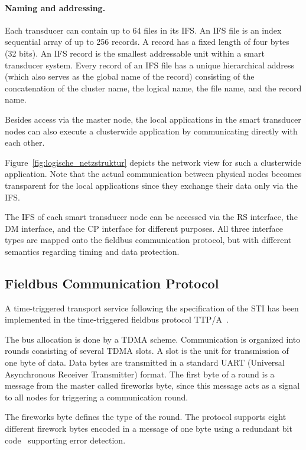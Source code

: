 \documentclass[11pt,a4paper,]{article}
\begin{document}
\paragraph{Naming and addressing.}

Each transducer can contain up to 64 files in its \ac{IFS}. An
\ac{IFS} file is an index sequential array of up to 256 records. A
record has a fixed length of four bytes (32 bits). An \ac{IFS}
record is the smallest addressable unit within a smart transducer
system. Every record of an \ac{IFS} file has a unique hierarchical
address (which also serves as the global name of the record)
consisting of the concatenation of the cluster name, the logical
name, the file name, and the record name.

Besides access via the master node, the local applications in the
smart transducer nodes can also execute a clusterwide application
by communicating directly with each other.

Figure~\ref{fig:logische_netzstruktur} depicts the network view for
such a clusterwide application. Note that the actual communication
between physical nodes becomes transparent for the local
applications since they exchange their data only via the \ac{IFS}.

The \ac{IFS} of each smart transducer node can be accessed via the
RS interface, the DM interface, and the CP interface for different
purposes. All three interface types are mapped onto the fieldbus
communication protocol, but with different semantics regarding
timing and data protection.

\subsection{Fieldbus Communication Protocol} \label{sec:fieldbus}

A time-triggered transport service following the specification of
the STI has been implemented in the time-triggered fieldbus
protocol TTP/A~\cite{ttpaspec}.

The bus allocation is done by a \ac{TDMA} scheme. Communication is
organized into rounds consisting of several \ac{TDMA} slots. A slot
is the unit for transmission of one byte of data. Data bytes are
transmitted in a standard UART (Universal Asynchronous Receiver
Transmitter) format. The first byte of a round is a message from the
master called fireworks byte, since this message acts as a signal to
all nodes for triggering a communication round.

The fireworks byte defines the type of the round. The protocol
supports eight different firework bytes encoded in a message of one
byte using a redundant bit code~\cite{haidinger:2000-5} supporting
error detection.
\end{document}
